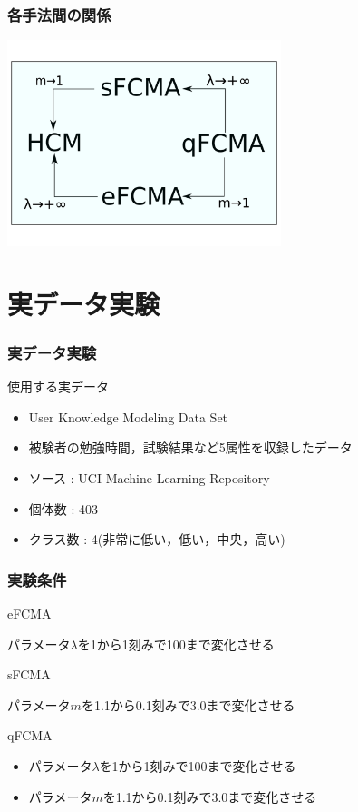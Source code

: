 \documentclass[13pt,dvipdfmx]{beamer}
\begin{document}
\begin{frame}\frametitle{各手法間の関係}
  \begin{center}
    \includegraphics[height=60mm]{method.png}
  \end{center}
\end{frame}

\section{実データ実験}
\begin{frame}\frametitle{実データ実験}
  \begin{block}{使用する実データ}
    \begin{itemize}
     \item User Knowledge Modeling Data Set
     \item 被験者の勉強時間，試験結果など5属性を収録したデータ
     \item ソース : UCI  Machine Learning Repository
     \item 個体数 : 403
     \item クラス数 : 4(非常に低い，低い，中央，高い)
    \end{itemize}
  \end{block}
\end{frame}

\begin{frame}\frametitle{実験条件}
  \begin{block}{eFCMA}
    \begin{center}
      パラメータ$\lambda$を1から1刻みで100まで変化させる
    \end{center}
  \end{block}
  \begin{block}{sFCMA}
    \begin{center}
      パラメータ$m$を1.1から0.1刻みで3.0まで変化させる
    \end{center}
  \end{block}
  \begin{block}{qFCMA}
    \begin{itemize}
      \item パラメータ$\lambda$を1から1刻みで100まで変化させる
      \item パラメータ$m$を1.1から0.1刻みで3.0まで変化させる
    \end{itemize}
  \end{block}
\end{frame}
\end{document}
